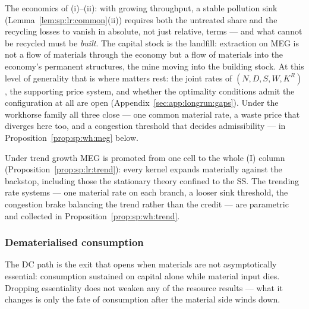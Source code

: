 The economics of (i)--(ii): with growing throughput, a stable pollution sink
(Lemma~\ref{lem:sp:lr:common}(ii)) requires both the untreated share and the recycling losses
to vanish in absolute, not just relative, terms --- and what cannot be recycled must be
\emph{built}. The capital stock is the landfill: extraction on MEG is not a flow of materials
through the economy but a flow of materials into the economy's permanent structures, the mine
moving into the building stock. At this level of generality that is where matters rest: the
joint rates of $\left(N,D,S,W,K^R\right)$, the supporting price system, and whether the
optimality conditions admit the configuration at all are open
(Appendix~\ref{sec:app:longrun:gaps}). Under the workhorse family all three close --- one
common material rate, a waste price that diverges here too, and a congestion threshold that
decides admissibility --- in Proposition~\ref{prop:sp:wh:meg} below.

Under trend growth MEG is promoted from one cell to the whole (I) column
(Proposition~\ref{prop:sp:lr:trend}): every kernel expands materially against the backstop,
including those the stationary theory confined to the SS. The trending rate systems --- one
material rate on each branch, a looser sink threshold, the congestion brake balancing the
trend rather than the credit --- are parametric and collected in
Proposition~\ref{prop:sp:wh:trend}.

\subsubsection{Dematerialised consumption}\label{sec:sp:longrun:path:dc}

The DC path is the exit that opens when materials are not asymptotically essential: consumption
sustained on capital alone while material input dies. Dropping essentiality does not weaken any
of the resource results --- what it changes is only the fate of consumption after the material
side winds down.

